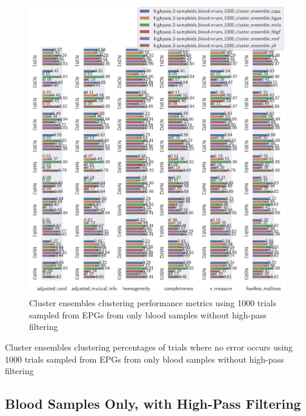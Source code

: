 \begin{theappendices}
\begin{figure}[htbp]
\centering
\includegraphics[width=\textwidth]{./figures/clust_comparison/highpass_0-sampleids_blood-nruns_1000_cluster_ensembles.pdf}
\caption{Cluster ensembles clustering performance metrics using 1000 trials sampled from EPGs from only blood samples without high-pass filtering}
\label{appendix:fig:highpass_0-sampleids_blood-nruns_1000_cluster_ensembles}
\end{figure}

\begin{table}[htbp]
\centering
{}
\caption{Cluster ensembles clustering percentages of trials where no error occurs using 1000 trials sampled from EPGs from only blood samples without high-pass filtering}
\label{appendix:table:highpass_0-sampleids_blood-nruns_1000_cluster_ensembles}
\end{table}

\FloatBarrier
\subsection{Blood Samples Only, with High-Pass Filtering}


\end{theappendices}
